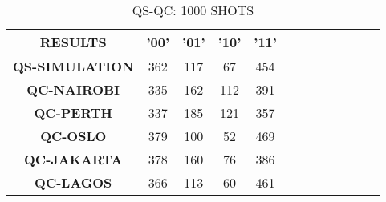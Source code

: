 \begin{table}[!ht]
    \raggedleft
    \begin{tabular}{cccccccccc}
    \hline
        \textbf{RESULTS} & \textbf{'00'} & \textbf{'01'} & \textbf{'10'} & \textbf{'11' } & \textbf{} & \textbf{} & \textbf{} & \textbf{} & \textbf{} \\ \hline
        \textbf{QS-SIMULATION} & 362 & 117 & 67 & 454  & ~ & ~ & ~ & ~ & ~ \\ 
        \textbf{QC-NAIROBI} & 335 & 162 & 112 & 391  & ~ & ~ & ~ & ~ & ~ \\ 
        \textbf{QC-PERTH} & 337 & 185 & 121 & 357  & ~ & ~ & ~ & ~ & ~ \\ 
        \textbf{QC-OSLO} & 379 & 100 & 52 & 469  & ~ & ~ & ~ & ~ & ~ \\ 
        \textbf{QC-JAKARTA} & 378 & 160 & 76 & 386  & ~ & ~ & ~ & ~ & ~ \\ 
        \textbf{QC-LAGOS} & 366 & 113 & 60 & 461 & ~ & ~ & ~ & ~ & ~ \\ \hline
    \end{tabular}
    \caption{QS-QC: 1000 SHOTS}
\end{table}





